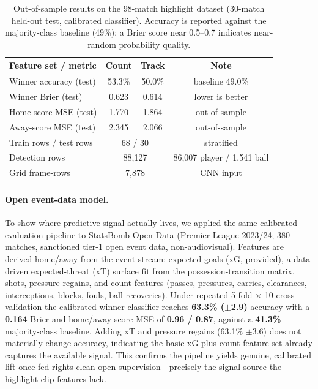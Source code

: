\documentclass[11pt]{article}
\begin{document}
\begin{table}[h]
\centering
\caption{Out-of-sample results on the 98-match highlight dataset (30-match held-out
test, calibrated classifier). Accuracy is reported against the majority-class
baseline (49\%); a Brier score near 0.5--0.7 indicates near-random probability
quality.}
\label{tab:results}
\begin{tabular}{lccc}
\toprule
Feature set / metric & Count & Track & Note \\
\midrule
Winner accuracy (test) & 53.3\% & 50.0\% & baseline 49.0\% \\
Winner Brier (test) & 0.623 & 0.614 & lower is better \\
Home-score MSE (test) & 1.770 & 1.864 & out-of-sample \\
Away-score MSE (test) & 2.345 & 2.066 & out-of-sample \\
Train rows / test rows & \multicolumn{2}{c}{68 / 30} & stratified \\
Detection rows & \multicolumn{2}{c}{88,127} & 86,007 player / 1,541 ball \\
Grid frame-rows & \multicolumn{2}{c}{7,878} & CNN input \\
\bottomrule
\end{tabular}
\end{table}

\paragraph{Open event-data model.} To show where predictive signal actually
lives, we applied the same calibrated evaluation pipeline to
StatsBomb Open Data (Premier League 2023/24; 380 matches, sanctioned tier-1
open event data, non-audiovisual). Features are derived home/away from the event
stream: expected goals (xG, provided), a data-driven expected-threat (xT)
surface fit from the possession-transition matrix, shots, pressure regains, and
count features (passes, pressures, carries, clearances, interceptions, blocks,
fouls, ball recoveries). Under repeated 5-fold $\times$ 10 cross-validation the
calibrated winner classifier reaches \textbf{63.3\% ($\pm$2.9)} accuracy with a
\textbf{0.164} Brier and home/away score MSE of \textbf{0.96 / 0.87}, against a
\textbf{41.3\%} majority-class baseline. Adding xT and pressure regains
(63.1\% $\pm$3.6) does not materially change accuracy, indicating the basic
xG-plus-count feature set already captures the available signal. This confirms
the pipeline yields genuine, calibrated lift once fed rights-clean open
supervision---precisely the signal source the highlight-clip features lack.
\end{document}
